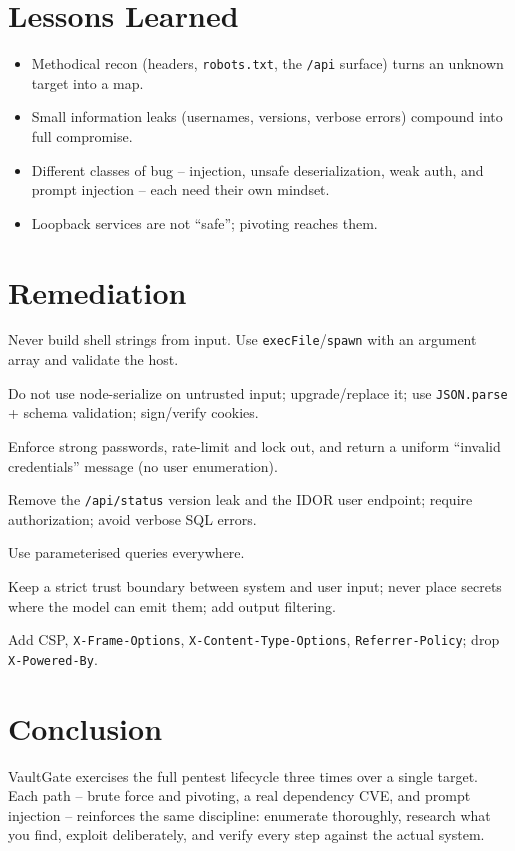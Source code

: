 \documentclass[11pt,a4paper]{article}
\begin{document}
\section{Lessons Learned}
\begin{itemize}[leftmargin=1.4cm]
  \item Methodical recon (headers, \texttt{robots.txt}, the \texttt{/api} surface)
  turns an unknown target into a map.
  \item Small information leaks (usernames, versions, verbose errors) compound into
  full compromise.
  \item Different classes of bug -- injection, unsafe deserialization, weak auth,
  and prompt injection -- each need their own mindset.
  \item Loopback services are not ``safe''; pivoting reaches them.
\end{itemize}

\section{Remediation}
\begin{description}[leftmargin=0.4cm,style=nextline]
  \item[Command injection] Never build shell strings from input. Use
  \texttt{execFile}/\texttt{spawn} with an argument array and validate the host.
  \item[Unsafe deserialization] Do not use node-serialize on untrusted input;
  upgrade/replace it; use \texttt{JSON.parse} + schema validation; sign/verify
  cookies.
  \item[Weak authentication] Enforce strong passwords, rate-limit and lock out,
  and return a uniform ``invalid credentials'' message (no user enumeration).
  \item[Information disclosure] Remove the \texttt{/api/status} version leak and the
  IDOR user endpoint; require authorization; avoid verbose SQL errors.
  \item[SQL injection] Use parameterised queries everywhere.
  \item[Prompt injection] Keep a strict trust boundary between system and user
  input; never place secrets where the model can emit them; add output filtering.
  \item[Headers] Add CSP, \texttt{X-Frame-Options}, \texttt{X-Content-Type-Options},
  \texttt{Referrer-Policy}; drop \texttt{X-Powered-By}.
\end{description}

\section{Conclusion}
VaultGate exercises the full pentest lifecycle three times over a single target.
Each path -- brute force and pivoting, a real dependency CVE, and prompt injection
-- reinforces the same discipline: enumerate thoroughly, research what you find,
exploit deliberately, and verify every step against the actual system.
\end{document}
